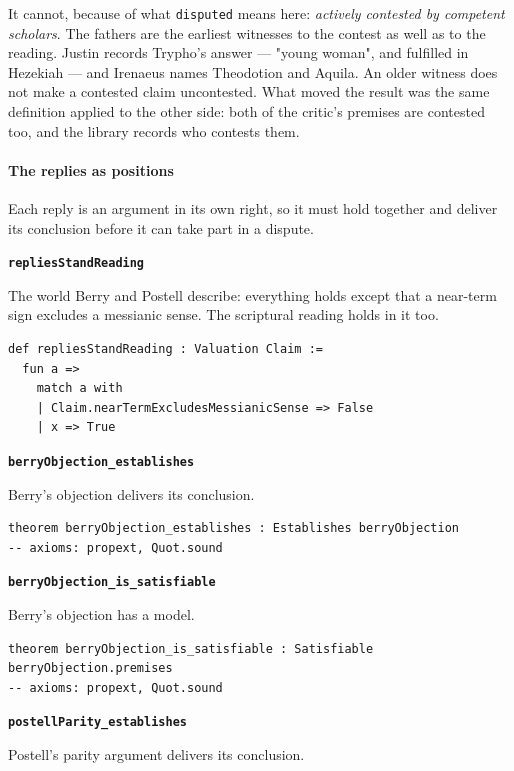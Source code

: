 \documentclass[11pt]{article}
\begin{document}
It cannot, because of what \texttt{disputed} means here: \emph{actively contested by competent scholars}. The fathers are the earliest witnesses to the contest as well as to the reading. Justin records Trypho's answer — "young woman", and fulfilled in Hezekiah — and Irenaeus names Theodotion and Aquila. An older witness does not make a contested claim uncontested. What moved the result was the same definition applied to the other side: both of the critic's premises are contested too, and the library records who contests them.

\paragraph*{The replies as positions}
\leavevmode\par
Each reply is an argument in its own right, so it must hold together and deliver its conclusion before it can take part in a dispute.

\par\medskip\noindent\textbf{\texttt{replies\allowbreak{}Stand\allowbreak{}Reading}}\par\nobreak\noindent
The world Berry and Postell describe: everything holds except that a near-term sign excludes a messianic sense. The scriptural reading holds in it too.

{\small\begin{verbatim}
def repliesStandReading : Valuation Claim :=
  fun a =>
    match a with
    | Claim.nearTermExcludesMessianicSense => False
    | x => True
\end{verbatim}}
\par\medskip\noindent\textbf{\texttt{berry\allowbreak{}Objection\_\allowbreak{}establishes}}\par\nobreak\noindent
Berry's objection delivers its conclusion.

{\small\begin{verbatim}
theorem berryObjection_establishes : Establishes berryObjection
-- axioms: propext, Quot.sound
\end{verbatim}}
\par\medskip\noindent\textbf{\texttt{berry\allowbreak{}Objection\_\allowbreak{}is\_\allowbreak{}satisfiable}}\par\nobreak\noindent
Berry's objection has a model.

{\small\begin{verbatim}
theorem berryObjection_is_satisfiable : Satisfiable berryObjection.premises
-- axioms: propext, Quot.sound
\end{verbatim}}
\par\medskip\noindent\textbf{\texttt{postell\allowbreak{}Parity\_\allowbreak{}establishes}}\par\nobreak\noindent
Postell's parity argument delivers its conclusion.
\end{document}
